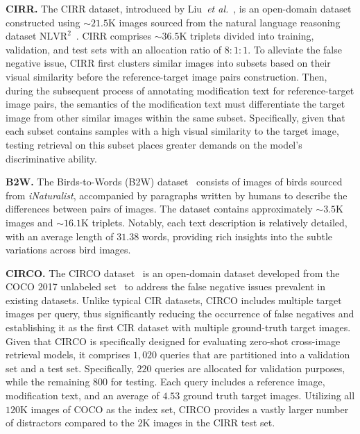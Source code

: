 \textbf{CIRR.} The CIRR dataset, introduced by Liu~\textit{et al.}~\cite{liu2021CIRPLANT}, is an open-domain dataset constructed using  $\sim21.5$K images sourced from the natural language reasoning dataset $\text{NLVR}^2$~\cite{suhr2019nvlr}. CIRR comprises $\sim36.5$K triplets divided into training, validation, and test sets with an allocation ratio of $8:1:1$. To alleviate the false negative issue, CIRR first clusters similar images into subsets based on their visual similarity before the reference-target image pairs construction. Then, during the subsequent process of annotating modification text for reference-target image pairs, the semantics of the modification text must differentiate the target image from other similar images within the same subset. Specifically, given that each subset contains samples with a high visual similarity to the target image, testing retrieval on this subset places greater demands on the model's discriminative ability.


\textbf{B2W.}
The Birds-to-Words (B2W) dataset~\cite{forbes2019b2w} consists of images of birds sourced from \textit{iNaturalist}, accompanied by paragraphs written by humans to describe the differences between pairs of images. The dataset contains approximately $\sim3.5$K images and $\sim16.1$K triplets. Notably, each text description is relatively detailed, with an average length of $31.38$ words, providing rich insights into the subtle variations across bird images. 


\textbf{CIRCO.} The CIRCO dataset~\cite{searle} is an open-domain dataset developed from the COCO 2017 unlabeled set~\cite{lin2014coco} to address the false negative issues prevalent in existing datasets. Unlike typical CIR datasets, CIRCO includes multiple target images per query, thus significantly reducing the occurrence of false negatives and establishing it as the first CIR dataset with multiple ground-truth target images. Given that CIRCO is specifically designed for evaluating zero-shot cross-image retrieval models, it comprises $1,020$ queries that are partitioned into a validation set and a test set. Specifically, $220$ queries are allocated for validation purposes, while the remaining $800$ for testing. Each query includes a reference image, modification text, and an average of $4.53$ ground truth target images. Utilizing all $120$K images of COCO as the index set, CIRCO provides a vastly larger number of distractors compared to the $2$K images in the CIRR test set.

